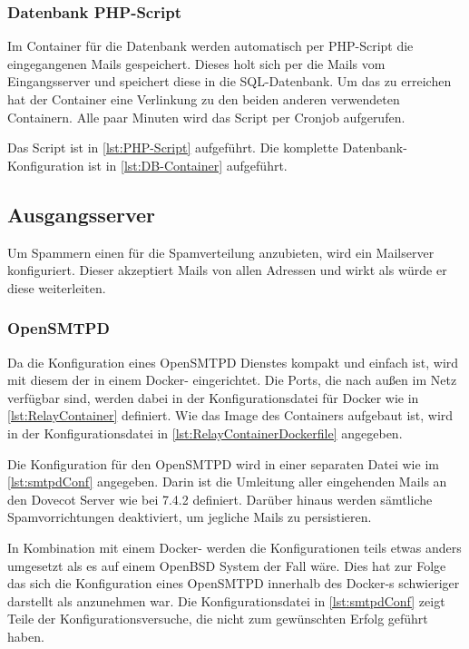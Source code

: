 \documentclass[a4paper,11pt,singlespacing]{article}
\begin{document}
		\subsubsection{Datenbank PHP-Script}\label{DB-Hook-Container}
			Im Container für die Datenbank werden automatisch per PHP-Script die eingegangenen Mails gespeichert. 
			Dieses holt sich per  die Mails vom Eingangsserver und speichert diese in die SQL-Datenbank.
			Um das zu erreichen hat der Container eine Verlinkung zu den beiden anderen verwendeten Containern.
			Alle paar Minuten wird das Script per Cronjob aufgerufen.

			Das Script ist in \autoref{lst:PHP-Script} aufgeführt.
			Die komplette Datenbank-Konfiguration ist in \autoref{lst:DB-Container} aufgeführt.

	\subsection{Ausgangsserver}\label{sec:UmsetzungOpenRelay}
		Um Spammern einen  für die Spamverteilung anzubieten, wird ein Mailserver konfiguriert.
		Dieser akzeptiert Mails von allen Adressen und wirkt als würde er diese weiterleiten.
		
		\subsubsection{OpenSMTPD}\label{OpenRelayOpenSMTPD}
			Da die Konfiguration eines \textsf{OpenSMTPD} Dienstes kompakt und einfach ist, wird mit diesem der  in einem Docker- eingerichtet.
			Die Ports, die nach au{\ss}en im Netz verfügbar sind, werden dabei in der Konfigurationsdatei für Docker wie in \autoref{lst:RelayContainer} definiert.
			Wie das Image des Containers aufgebaut ist, wird in der Konfigurationsdatei in \autoref{lst:RelayContainerDockerfile} angegeben.

			Die Konfiguration für den \textsf{OpenSMTPD} wird in einer separaten Datei wie im \autoref{lst:smtpdConf} angegeben.
			Darin ist die Umleitung aller eingehenden Mails an den Dovecot Server wie bei 7.4.2 definiert.
			Darüber hinaus werden sämtliche Spamvorrichtungen deaktiviert, um jegliche Mails zu persistieren.

			In Kombination mit einem Docker- werden die Konfigurationen teils etwas anders umgesetzt als es auf einem OpenBSD System der Fall wäre.
			Dies hat zur Folge das sich die Konfiguration eines \textsf{OpenSMTPD} innerhalb des Docker-s schwieriger darstellt als anzunehmen war.
			Die Konfigurationsdatei in \autoref{lst:smtpdConf} zeigt Teile der Konfigurationsversuche, die nicht zum gewünschten Erfolg geführt haben.
\end{document}
